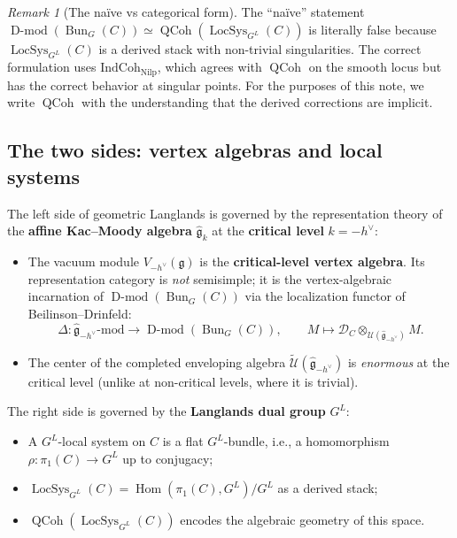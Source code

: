 \documentclass[11pt]{article}
\theoremstyle{definition}
\theoremstyle{remark}
\newtheorem{remark}[theorem]{Remark}
\DeclareMathOperator{\Bun}{Bun}
\DeclareMathOperator{\LocSys}{LocSys}
\DeclareMathOperator{\QCoh}{QCoh}
\DeclareMathOperator{\Dmod}{D\text{-}mod}
\DeclareMathOperator{\Hom}{Hom}
\newcommand{\g}{\mathfrak{g}}
\newcommand{\hv}{h^\vee}
\begin{document}
\begin{remark}[The na\"ive vs categorical form]
The ``na\"ive'' statement
$\Dmod(\Bun_G(C)) \simeq \QCoh(\LocSys_{G^L}(C))$ is literally false because
$\LocSys_{G^L}(C)$ is a derived stack with non-trivial singularities.
The correct formulation uses $\mathrm{IndCoh}_{\mathrm{Nilp}}$, which agrees
with $\QCoh$ on the smooth locus but has the correct behavior at singular
points. For the purposes of this note, we write $\QCoh$ with the understanding
that the derived corrections are implicit.
\end{remark}

\subsection{The two sides: vertex algebras and local systems}
\label{subsec:two-sides}

The left side of geometric Langlands is governed by the representation theory
of the \textbf{affine Kac--Moody algebra} $\hat{\g}_k$ at the
\textbf{critical level} $k = -\hv$:

\begin{itemize}
 \item The vacuum module $V_{-\hv}(\g)$ is the \textbf{critical-level vertex
 algebra}. Its representation category is \emph{not} semisimple; it is the
 vertex-algebraic incarnation of $\Dmod(\Bun_G(C))$ via the
 localization functor of Beilinson--Drinfeld:
 \[
 \Delta \colon \hat{\g}_{-\hv}\text{-mod} \longrightarrow
 \Dmod(\Bun_G(C)), \qquad
 M \longmapsto \mathcal{D}_C \otimes_{\mathcal{U}(\hat{\g}_{-\hv})} M.
 \]
 \item The center of the completed enveloping algebra
 $\widetilde{\mathcal{U}}(\hat{\g}_{-\hv})$ is \emph{enormous} at the
 critical level (unlike at non-critical levels, where it is trivial).
\end{itemize}

The right side is governed by the \textbf{Langlands dual group} $G^L$:
\begin{itemize}
 \item A $G^L$-local system on $C$ is a flat $G^L$-bundle, i.e., a
 homomorphism $\rho \colon \pi_1(C) \to G^L$ up to conjugacy;
 \item $\LocSys_{G^L}(C) = \Hom(\pi_1(C), G^L)/G^L$ as a derived stack;
 \item $\QCoh(\LocSys_{G^L}(C))$ encodes the algebraic geometry of this
 space.
\end{itemize}
\end{document}
